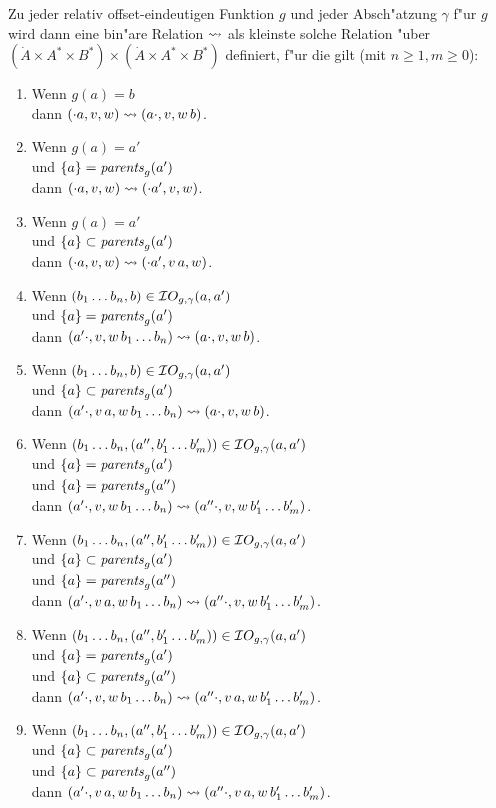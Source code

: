 \documentclass[12pt,a4paper]{article}
\begin{document}
Zu jeder relativ offset-eindeutigen Funktion $g$ und jeder Absch"atzung $\gamma$ f"ur $g$ wird dann eine
bin"are Relation $\rightsquigarrow$ als kleinste solche Relation "uber
$(\dot{A} \times A^* \times B^*) \times (\dot{A} \times A^* \times B^*)$ definiert, f"ur die gilt
(mit $n \ge 1, m \ge 0$):
\begin{enumerate}
\item Wenn $g(a) = b$ \\
  dann $(\cdot a,v,w) \rightsquigarrow (a \cdot,v,w\,b)$.
\item Wenn $g(a) = a'$ \\
  und $\{a\} = \mathit{parents}_g(a')$ \\
  dann $(\cdot a,v,w) \rightsquigarrow (\cdot a',v,w)$.
\item Wenn $g(a) = a'$ \\
  und $\{a\} \subset \mathit{parents}_g(a')$ \\
  dann $(\cdot a,v,w) \rightsquigarrow (\cdot a',v\,a,w)$.
\item Wenn $(b_1 \ldots b_n,b) \in \mathcal IO_{g,\gamma}(a,a')$ \\
  und $\{a\} = \mathit{parents}_g(a')$ \\
  dann $(a' \cdot,v,w\,b_1 \ldots b_n) \rightsquigarrow (a \cdot,v,w\,b)$.
\item Wenn $(b_1 \ldots b_n,b) \in \mathcal IO_{g,\gamma}(a,a')$ \\
  und $\{a\} \subset \mathit{parents}_g(a')$ \\
  dann $(a' \cdot,v\,a,w\,b_1 \ldots b_n) \rightsquigarrow (a \cdot,v,w\,b)$.
\item Wenn $(b_1 \ldots b_n,(a'',b_1' \ldots b_m')) \in \mathcal IO_{g,\gamma}(a,a')$ \\
  und $\{a\} = \mathit{parents}_g(a')$ \\
  und $\{a\} = \mathit{parents}_g(a'')$ \\
  dann $(a' \cdot,v,w\,b_1 \ldots b_n) \rightsquigarrow (a'' \cdot,v,w\,b_1' \ldots b_m')$.
\item Wenn $(b_1 \ldots b_n,(a'',b_1' \ldots b_m')) \in \mathcal IO_{g,\gamma}(a,a')$ \\
  und $\{a\} \subset \mathit{parents}_g(a')$ \\
  und $\{a\} = \mathit{parents}_g(a'')$ \\
  dann $(a' \cdot,v\,a,w\,b_1 \ldots b_n) \rightsquigarrow (a'' \cdot,v,w\,b_1' \ldots b_m')$.
\item Wenn $(b_1 \ldots b_n,(a'',b_1' \ldots b_m')) \in \mathcal IO_{g,\gamma}(a,a')$ \\
  und $\{a\} = \mathit{parents}_g(a')$ \\
  und $\{a\} \subset \mathit{parents}_g(a'')$ \\
  dann $(a' \cdot,v,w\,b_1 \ldots b_n) \rightsquigarrow (a'' \cdot,v\,a,w\,b_1' \ldots b_m')$.
\item Wenn $(b_1 \ldots b_n,(a'',b_1' \ldots b_m')) \in \mathcal IO_{g,\gamma}(a,a')$ \\
  und $\{a\} \subset \mathit{parents}_g(a')$ \\
  und $\{a\} \subset \mathit{parents}_g(a'')$ \\
  dann $(a' \cdot,v\,a,w\,b_1 \ldots b_n) \rightsquigarrow (a'' \cdot,v\,a,w\,b_1' \ldots b_m')$.
\end{enumerate}
\end{document}
